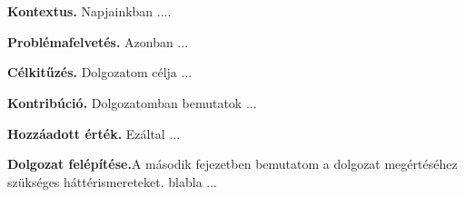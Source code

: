 \chapter{\bevezetes}

\textbf{Kontextus.} Napjainkban ....

\textbf{Problémafelvetés.} Azonban ...

\textbf{Célkitűzés.} Dolgozatom célja ...

\textbf{Kontribúció.} Dolgozatomban bemutatok ...

\textbf{Hozzáadott érték.} Ezáltal ...

\textbf{Dolgozat felépítése.}A második fejezetben bemutatom a dolgozat megértéséhez szükséges háttérismereteket. blabla ...

